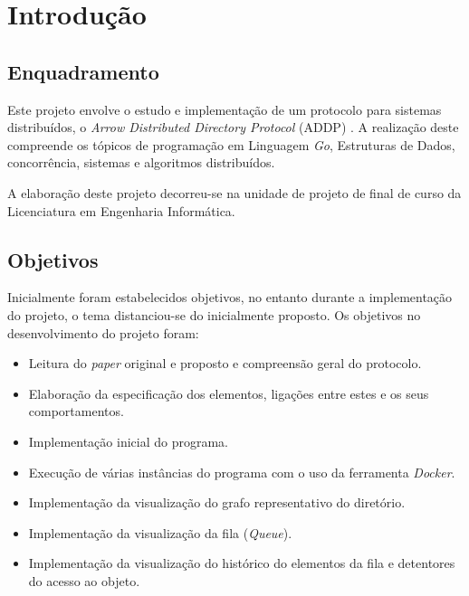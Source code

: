 \chapter{Introdução}
\label{chap:intro}
\section{Enquadramento}
\label{sec:amb} 



Este projeto envolve o estudo e implementação de um protocolo para sistemas distribuídos, o \textit{Arrow Distributed Directory Protocol} (ADDP) \cite{Arrow}. 
A realização deste compreende os tópicos de programação em Linguagem \emph{Go}, Estruturas de Dados, concorrência, sistemas e algoritmos distribuídos.

A elaboração deste projeto decorreu-se na unidade de projeto de final de curso da Licenciatura em Engenharia Informática.



\section{Objetivos}
\label{sec:obj}
Inicialmente foram estabelecidos objetivos, no entanto durante a implementação do projeto, o tema distanciou-se do inicialmente proposto. 
Os objetivos no desenvolvimento do projeto foram:

\begin{itemize}
    \item Leitura do \emph{paper} original e proposto e compreensão geral do protocolo.
    \item Elaboração da especificação dos elementos, ligações entre estes e os seus comportamentos.
    \item Implementação inicial do programa.
    \item Execução de várias instâncias do programa com o uso da ferramenta \emph{Docker}.
    \item Implementação da visualização do grafo representativo do diretório.
    \item Implementação da visualização da fila (\emph{Queue}).
    \item Implementação da visualização do histórico do elementos da fila e detentores do acesso ao objeto.

\end{itemize}

